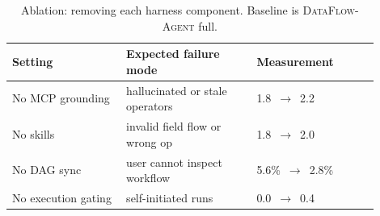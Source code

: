 \begin{table}[t]
\centering
\small
\begin{tabular}{p{0.28\linewidth}p{0.32\linewidth}p{0.30\linewidth}}
\toprule
Setting & Expected failure mode & Measurement \\
\midrule
No MCP grounding & hallucinated or stale operators & 1.8~$\to$~2.2 \\
No skills & invalid field flow or wrong op & 1.8~$\to$~2.0 \\
No DAG sync & user cannot inspect workflow & 5.6\%~$\to$~2.8\% \\
No execution gating & self-initiated runs & 0.0~$\to$~0.4 \\
\bottomrule
\end{tabular}
\caption{Ablation: removing each harness component. Baseline is \textsc{DataFlow-Agent} full.}
\label{tab:ablation}
\end{table}
